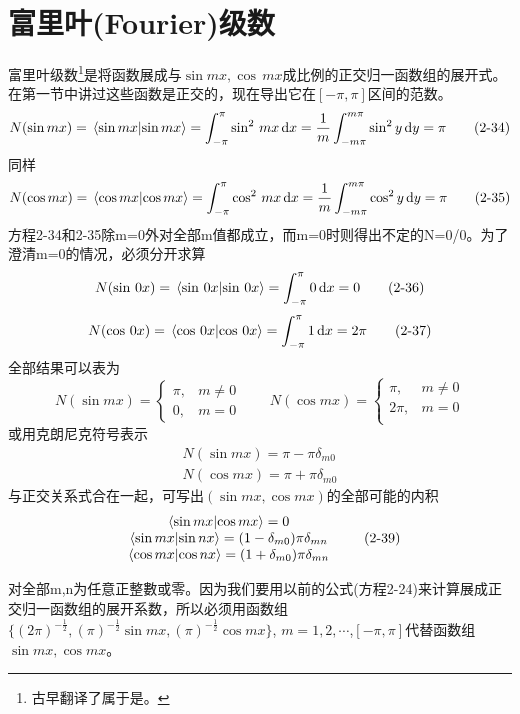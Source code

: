 \section{富里叶(Fourier)级数}

富里叶级数\footnote{古早翻译了属于是。}是将函数展成与${\sin mx,\cos \, mx}$成比例的正交归一函数组的展开式。
在第一节中讲过这些函数是正交的，现在导出它在$[-\pi,\pi]$区间的范数。
\[N(\sin mx)=\bra*{\sin mx}\ket*{\sin mx}=\int_{-\pi}^{\pi}\sin^2 \, mx\dd{x}=\frac{1}{m}\int_{-m\pi}^{m\pi}\sin^2y\dd{y}=\pi \tag{2-34}\]
同样
\[N(\cos mx)=\bra*{\cos mx}\ket*{\cos mx}=\int_{-\pi}^{\pi}\cos ^2 \, mx\dd{x}=\frac{1}{m}\int_{-m\pi}^{m\pi}\cos ^2y\dd{y}=\pi \tag{2-35}\]
方程2-34和2-35除m=0外对全部m值都成立，而m=0时则得出不定的N=0/0。为了澄清m=0的情况，必须分开求算
\[N(\sin \, 0x)=\bra*{\sin \, 0x}\ket*{\sin \, 0x}=\int_{-\pi}^{\pi}0\dd{x}=0 \tag{2-36}\]
\[N(\cos  \, 0x)=\bra*{\cos  \, 0x}\ket*{\cos  \, 0x}=\int_{-\pi}^{\pi}1\dd{x}=2\pi \tag{2-37}\]
全部结果可以表为
\[
N(\sin mx)=\left\{
\begin{array}{rl}
    \pi, & m \neq 0 \\
    0, & m=0
\end{array}
\right.
\qquad
N(\cos mx)=\left\{
\begin{array}{rl}
    \pi, & m \neq 0 \\
    2\pi, & m=0 \\
\end{array}  
\right.  
\tag{2-38a}
\]
或用克朗尼克符号表示
\[
\begin{array}{c}
    N(\sin mx)=\pi-\pi \delta_{m0} \\
    N(\cos mx)=\pi+\pi \delta_{m0}
\end{array}    
\tag{2-38b}
\]
与正交关系式合在一起，可写出$(\sin mx ,\cos mx)$的全部可能的内积
\[
\begin{array}{c}
    \bra*{\sin mx}\ket*{\cos mx}=0 \\
    \bra*{\sin mx}\ket*{\sin nx}=(1-\delta_{m0})\pi \delta_{mn} \\
    \bra*{\cos mx}\ket*{\cos nx}=(1+\delta_{m0})\pi \delta_{mn}
\end{array}    
\tag{2-39}
\]

对全部m,n为任意正整數或零。因为我们要用以前的公式(方程2-24)来计算展成正交归一函数组的展开系数，所以必须用函数组
$\{(2\pi)^{-\frac{1}{2}},(\pi)^{-\frac{1}{2}}\sin mx,(\pi)^{-\frac{1}{2}}\cos mx\}$, $m=1,2,\cdots $,$[-\pi,\pi]$代替函数组${\sin mx ,\cos mx}$。

